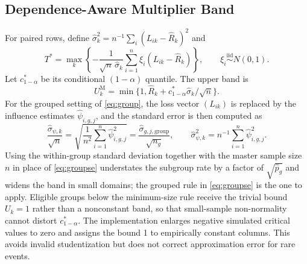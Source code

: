 \documentclass[twoside,11pt]{article}
\begin{document}
\subsection{Dependence-Aware Multiplier Band}
For paired rows, define $\widehat\sigma_k^2=n^{-1}\sum_i(L_{ik}-\widehat R_k)^2$ and
\begin{equation}
T^*=\max_k\left\{-\frac{1}{\sqrt n\,\widehat\sigma_k}\sum_{i=1}^n\xi_i(L_{ik}-\widehat R_k)\right\},
\qquad \xi_i\stackrel{\mathrm{iid}}\sim N(0,1).
\label{eq:multiplier}
\end{equation}
Let $c^*_{1-\alpha}$ be its conditional $(1-\alpha)$ quantile. The upper band is
\begin{equation}
U_k^{\mathrm M}=\min\{1,\widehat R_k+c^*_{1-\alpha}\widehat\sigma_k/\sqrt n\}.
\label{eq:multupper}
\end{equation}
For the grouped setting of \eqref{eq:group}, the loss vector $(L_{ik})$ is replaced by the
influence estimates $\widehat\psi_{i,g,j}$, and the standard error is then computed as
\begin{equation}
\frac{\widehat\sigma_{\psi,k}}{\sqrt n}=
\sqrt{\frac{1}{n^2}\sum_{i=1}^n\widehat\psi_{i,g,j}^2}=
\frac{\widehat\sigma_{g,j,\mathrm{group}}}{\sqrt{n_g}},
\qquad \widehat\sigma_{\psi,k}^2=n^{-1}\sum_{i=1}^n\widehat\psi_{i,g,j}^2.
\label{eq:groupse}
\end{equation}
Using the within-group standard deviation together with the master sample size $n$ in place
of \eqref{eq:groupse} understates the subgroup rate by a factor of $\sqrt{\widehat p_g}$ and
widens the band in small domains; the grouped rule in \eqref{eq:groupse} is the one to apply.
Eligible groups below the minimum-size rule receive the trivial bound $U_k=1$ rather than a
nonconstant band, so that small-sample non-normality cannot distort $c^*_{1-\alpha}$.
The implementation enlarges negative simulated critical values to zero and assigns the bound
1 to empirically constant columns. This avoids invalid studentization but does not correct
approximation error for rare events.
\end{document}
